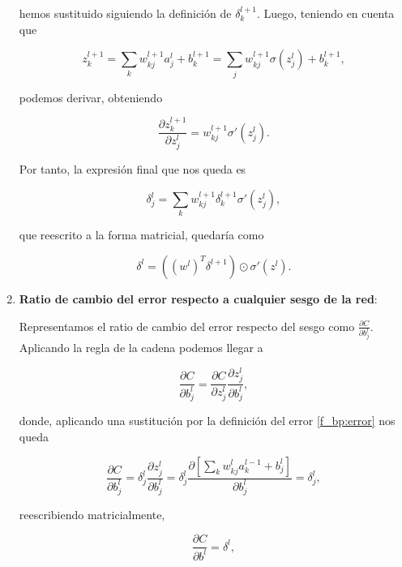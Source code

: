 \begin{appendices}
\begin{enumerate}
	hemos sustituido siguiendo la definición de $\delta_k^{l+1}$. Luego, teniendo en cuenta que

	\begin{equation}
		z_k^{l+1} = \sum_k w_{kj}^{l+1}a_j^l + b_k^{l+1} = \sum_j w_{kj}^{l+1}\sigma(z_j^l) + b_k^{l+1},
	\end{equation}

	podemos derivar, obteniendo

	\begin{equation}
		\frac{\partial z_k^{l+1}}{\partial z_j^l} = w_{kj}^{l+1}\sigma'(z_j^l).
	\end{equation}

	Por tanto, la expresión final que nos queda es

	\begin{equation}\label{f_bp:error_intermedio}
		\delta_j^l = \sum_k w_{kj}^{l+1}\delta_k^{l+1}\sigma'(z_j^l),
	\end{equation}

	que reescrito a la forma matricial, quedaría como

	\begin{equation}\label{f_bp:error_intermedio_mat}
		\delta^l = ((w^l)^T\delta^{l+1}) \odot \sigma'(z^l).
	\end{equation}

	\item \textbf{Ratio de cambio del error respecto a cualquier sesgo de la red}:

	Representamos el ratio de cambio del error respecto del sesgo como $\frac{\partial C}{\partial b_j^l}$. Aplicando la regla de la cadena podemos llegar a

	\begin{equation}
		\frac{\partial C}{\partial b_j^l} = \frac{\partial C}{\partial z_j^l} \frac{\partial z_j^l}{\partial b_j^l},
	\end{equation}

	donde, aplicando una sustitución por la definición del error \eqref{f_bp:error} nos queda

	\begin{equation}\label{f_bp:ratio_sesgo}
		\frac{\partial C}{\partial b_j^l} = \delta_j^l \frac{\partial z_j^l}{\partial b_j^l} = \delta_j^l \frac{\partial \left[\sum_k w_{kj}^l a_k^{l-1} + b_j^l \right]}{\partial b_j^l} = \delta_j^l,
	\end{equation}

	reescribiendo matricialmente,

	\begin{equation}\label{f_bp:ratio_sesgo_mat}
		\frac{\partial C}{\partial b^l} = \delta^l,
	\end{equation}


\end{enumerate}
\end{appendices}
